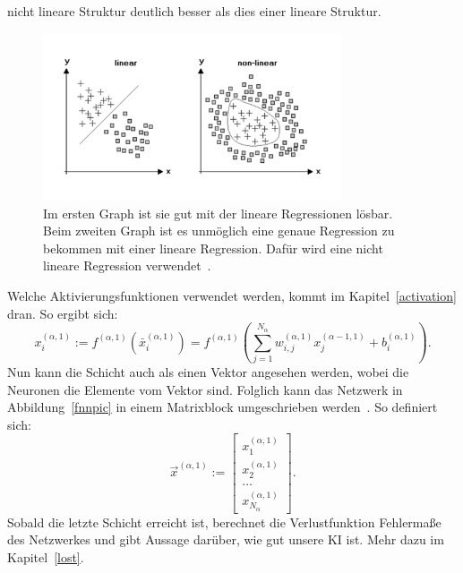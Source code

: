 \documentclass[11pt]{article}
\begin{document}
nicht lineare Struktur deutlich besser als dies einer lineare Struktur.
\begin{figure}[h]
    \centering
    \includegraphics[width=250pt, keepaspectratio]{images/regression}
    \caption[Lineare Regression und nicht lineare Regression~\cite{6}]{Im ersten Graph ist sie gut mit der lineare Regressionen lösbar. Beim zweiten Graph ist es
    unmöglich eine genaue Regression zu bekommen mit einer lineare Regression. Dafür wird eine nicht lineare Regression verwendet~\cite{6}.}\label{regressionpic}
\end{figure}
Welche Aktivierungsfunktionen verwendet werden, kommt im Kapitel~\ref{activation} dran. So ergibt sich:
\begin{equation}
    x_{i}^{(\alpha,1)} := f^{(\alpha,1)}(\bar{x}_{i}^{(\alpha,1)}) = f^{(\alpha,1)}(\sum_{j=1}^{N_{\alpha}} w_{i,j}^{(\alpha,1)} x_{j}^{(\alpha-1,1)} + b_{i}^{(\alpha,1)}).
\end{equation}
Nun kann die Schicht auch als einen Vektor angesehen werden, wobei die Neuronen die Elemente vom Vektor sind. Folglich kann das Netzwerk
in Abbildung~\ref{fnnpic} in einem Matrixblock umgeschrieben werden~\cite{13}. So definiert sich:
\begin{equation}\label{withfunction}
    \vec{x}^{(\alpha,1)} := \begin{bmatrix}x_{1}^{(\alpha,1)} \\ x_{2}^{(\alpha,1)} \\ \ldots \\ x_{N_{\alpha}}^{(\alpha,1)} \end{bmatrix}.
\end{equation}
Sobald die letzte Schicht erreicht ist, berechnet die Verlustfunktion Fehlermaße des Netzwerkes und gibt Aussage darüber, wie gut
unsere KI ist. Mehr dazu im Kapitel~\ref{lost}.
\end{document}
